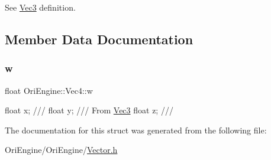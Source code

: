 See \hyperlink{struct_ori_engine_1_1_vec3}{Vec3} definition. 



\subsection{Member Data Documentation}
\hypertarget{struct_ori_engine_1_1_vec4_ab69be65aad84be7c1904aef48cb34f95}{}\label{struct_ori_engine_1_1_vec4_ab69be65aad84be7c1904aef48cb34f95} 
\subsubsection{\texorpdfstring{w}{w}}
{\footnotesize\ttfamily float Ori\+Engine\+::\+Vec4\+::w}

float x; /// float y; /// From \hyperlink{struct_ori_engine_1_1_vec3}{Vec3} float z; /// 

The documentation for this struct was generated from the following file\+:\begin{DoxyCompactItemize}
\item 
Ori\+Engine/\+Ori\+Engine/\hyperlink{_vector_8h}{Vector.\+h}\end{DoxyCompactItemize}
